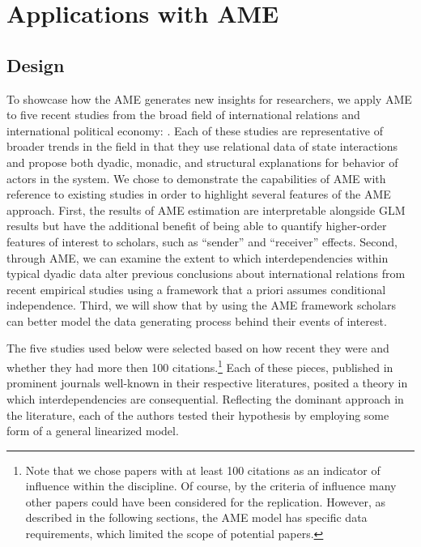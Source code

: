\section{\textbf{Applications with AME}}

\subsection{Design}

To showcase how the AME generates new insights for researchers, we apply AME to five recent studies from the broad field of international relations and international political economy: \citet{reiter:stam:2003, mcdonald:2004,  rose:2004, weeks:2012, gibler:2017}. Each of these studies are representative of broader trends in the field in that they use relational data of state interactions and propose both dyadic, monadic, and structural explanations for behavior of actors in the system. We chose to demonstrate the capabilities of AME with reference to existing studies in order to highlight several features of the AME approach. First, the results of AME estimation are interpretable alongside GLM results but have the additional benefit of being able to quantify higher-order features of interest to scholars, such as ``sender'' and ``receiver'' effects. Second, through AME, we can examine the extent to which interdependencies within typical dyadic data alter previous conclusions about international relations from recent empirical studies using a framework that a priori assumes conditional independence. Third, we will show that by using the AME framework scholars can better model the data generating process behind their events of interest.

The five studies used below were selected based on how recent they were and whether they had more then 100 citations.\footnote{Note that we chose papers with at least 100 citations as an indicator of influence within the discipline. Of course, by the criteria of influence many other papers could have been considered for the replication. However, as described in the following sections, the AME model has specific data requirements, which limited the scope of potential papers.}  Each of these pieces, published in prominent journals well-known in their respective literatures, posited a theory in which interdependencies are consequential. Reflecting the dominant approach in the literature, each of the authors tested their hypothesis by employing some form of a general linearized model. 
 
